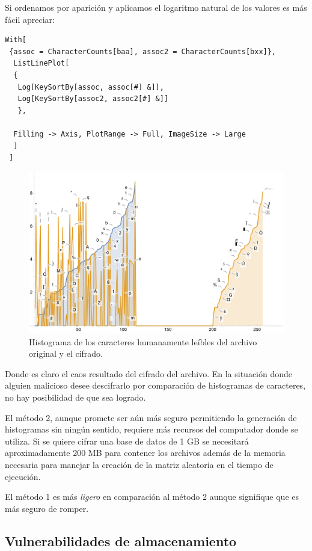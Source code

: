 \documentclass[a4paper]{article}
\begin{document}
Si ordenamos por aparición y aplicamos el logaritmo natural de los valores es
más fácil apreciar:

\begin{verbatim}
With[
 {assoc = CharacterCounts[baa], assoc2 = CharacterCounts[bxx]},
  ListLinePlot[
  {
   Log[KeySortBy[assoc, assoc[#] &]],
   Log[KeySortBy[assoc2, assoc2[#] &]]
   },
  
  Filling -> Axis, PlotRange -> Full, ImageSize -> Large
  ]
 ]
\end{verbatim}

\begin{figure}[H]
    \centering
    \includegraphics[width=\textwidth]{histo1}
    \caption{Histograma de los caracteres humanamente leíbles del archivo
original y el cifrado.}
    \label{fig:Histo0}
\end{figure}


Donde es claro el caos resultado del cifrado del archivo. En la situación donde
alguien malicioso desee descifrarlo por comparación de histogramas de
caracteres, no hay posibilidad de que sea logrado.

El método 2, aunque promete ser aún más seguro permitiendo la generación de
histogramas sin ningún sentido, requiere más recursos del computador donde se
utiliza. Si se quiere cifrar una base de datos de 1 GB se necesitará
aproximadamente 200 MB para contener los archivos además de la memoria
necesaria para manejar la creación de la matriz aleatoria en el tiempo de
ejecución.

El método 1 es más \textit{ligero} en comparación al método 2 aunque signifique
que es más seguro de romper.

\subsection{Vulnerabilidades de almacenamiento}
\end{document}
